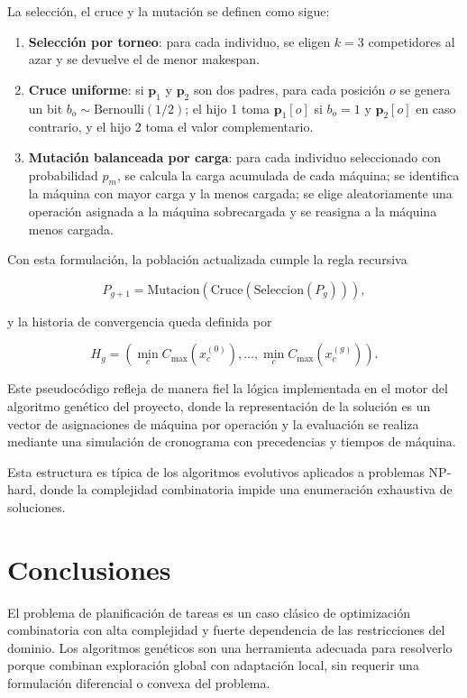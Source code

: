 \documentclass[11pt,a4paper]{article}
\begin{document}
La selección, el cruce y la mutación se definen como sigue:

\begin{enumerate}
    \item \textbf{Selección por torneo}: para cada individuo, se eligen $k=3$ competidores al azar y se devuelve el de menor makespan.
    \item \textbf{Cruce uniforme}: si $\mathbf{p}_1$ y $\mathbf{p}_2$ son dos padres, para cada posición $o$ se genera un bit $b_o \sim \text{Bernoulli}(1/2)$; el hijo 1 toma $\mathbf{p}_1[o]$ si $b_o = 1$ y $\mathbf{p}_2[o]$ en caso contrario, y el hijo 2 toma el valor complementario.
    \item \textbf{Mutación balanceada por carga}: para cada individuo seleccionado con probabilidad $p_m$, se calcula la carga acumulada de cada máquina; se identifica la máquina con mayor carga y la menos cargada; se elige aleatoriamente una operación asignada a la máquina sobrecargada y se reasigna a la máquina menos cargada.
\end{enumerate}

Con esta formulación, la población actualizada cumple la regla recursiva

$$
P_{g+1} = \text{Mutacion}\left(\text{Cruce}\left(\text{Seleccion}(P_g)\right)\right),
$$

y la historia de convergencia queda definida por

$$
H_g = \left(\min_{c} C_{\max}(x_c^{(0)}), \dots, \min_{c} C_{\max}(x_c^{(g)})\right).
$$

Este pseudocódigo refleja de manera fiel la lógica implementada en el motor del algoritmo genético del proyecto, donde la representación de la solución es un vector de asignaciones de máquina por operación y la evaluación se realiza mediante una simulación de cronograma con precedencias y tiempos de máquina.

Esta estructura es típica de los algoritmos evolutivos aplicados a problemas NP-hard, donde la complejidad combinatoria impide una enumeración exhaustiva de soluciones.

\section{Conclusiones}

El problema de planificación de tareas es un caso clásico de optimización combinatoria con alta complejidad y fuerte dependencia de las restricciones del dominio. Los algoritmos genéticos son una herramienta adecuada para resolverlo porque combinan exploración global con adaptación local, sin requerir una formulación diferencial o convexa del problema.
\end{document}
